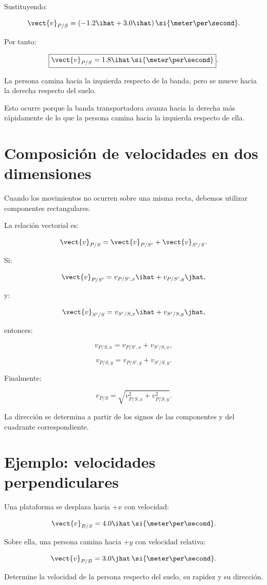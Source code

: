 Sustituyendo:

\[
\vect{v}_{P/S}
=
(-1.2\ihat+3.0\ihat)
\,\si{\meter\per\second}.
\]

Por tanto:

\[
\boxed{
\vect{v}_{P/S}
=
1.8\ihat\,
\si{\meter\per\second}
}.
\]

\begin{interpretacion}

La persona camina hacia la izquierda respecto de la banda,
pero se mueve hacia la derecha respecto del suelo.

Esto ocurre porque la banda transportadora avanza hacia
la derecha más rápidamente de lo que la persona camina
hacia la izquierda respecto de ella.

\end{interpretacion}


\section{Composición de velocidades en dos dimensiones}

Cuando los movimientos no ocurren sobre una misma recta,
debemos utilizar componentes rectangulares.

La relación vectorial es:

\[
\vect{v}_{P/S}
=
\vect{v}_{P/S'}
+
\vect{v}_{S'/S}.
\]

Si:

\[
\vect{v}_{P/S'}
=
v_{P/S',x}\ihat+v_{P/S',y}\jhat,
\]

y:

\[
\vect{v}_{S'/S}
=
v_{S'/S,x}\ihat+v_{S'/S,y}\jhat,
\]

entonces:

\[
\boxed{
v_{P/S,x}
=
v_{P/S',x}+v_{S'/S,x}
},
\]

\[
\boxed{
v_{P/S,y}
=
v_{P/S',y}+v_{S'/S,y}
}.
\]

Finalmente:

\[
v_{P/S}
=
\sqrt{
v_{P/S,x}^2+v_{P/S,y}^2
}.
\]

La dirección se determina a partir de los signos de
las componentes y del cuadrante correspondiente.


\section{Ejemplo: velocidades perpendiculares}

\begin{ejemplo}

Una plataforma se desplaza hacia \(+x\) con velocidad:

\[
\vect{v}_{B/S}
=
4.0\ihat\,
\si{\meter\per\second}.
\]

Sobre ella, una persona camina hacia \(+y\) con
velocidad relativa:

\[
\vect{v}_{P/B}
=
3.0\jhat\,
\si{\meter\per\second}.
\]

Determine la velocidad de la persona respecto del suelo,
su rapidez y su dirección.

\end{ejemplo}

